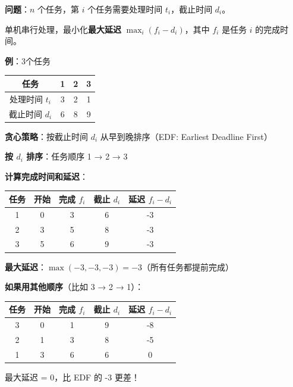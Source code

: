 \documentclass[12pt, a4paper]{ctexart}
\begin{document}
\begin{blackboard}[最小化最大延迟问题]

\textbf{问题}：$n$ 个任务，第 $i$ 个任务需要处理时间 $t_i$，截止时间 $d_i$。

单机串行处理，最小化\textbf{最大延迟} $\max_i (f_i - d_i)$，其中 $f_i$ 是任务 $i$ 的完成时间。

\textbf{例}：3个任务

\begin{center}
\begin{tabular}{c|ccc}
任务 & 1 & 2 & 3 \\
\hline
处理时间 $t_i$ & 3 & 2 & 1 \\
截止时间 $d_i$ & 6 & 8 & 9 \\
\end{tabular}
\end{center}

\textbf{贪心策略}：按截止时间 $d_i$ 从早到晚排序（EDF: Earliest Deadline First）

\end{blackboard}

\begin{blackboard}[最小化最大延迟手算]

\textbf{按 $d_i$ 排序}：任务顺序 1 → 2 → 3

\textbf{计算完成时间和延迟}：

\begin{center}
\begin{tabular}{c|cccc}
任务 & 开始 & 完成 $f_i$ & 截止 $d_i$ & 延迟 $f_i - d_i$ \\
\hline
1 & 0 & 3 & 6 & -3 \\
2 & 3 & 5 & 8 & -3 \\
3 & 5 & 6 & 9 & -3 \\
\end{tabular}
\end{center}

\textbf{最大延迟}：$\max(-3, -3, -3) = -3$（所有任务都提前完成）

\textbf{如果用其他顺序}（比如 3 → 2 → 1）：

\begin{center}
\begin{tabular}{c|cccc}
任务 & 开始 & 完成 $f_i$ & 截止 $d_i$ & 延迟 $f_i - d_i$ \\
\hline
3 & 0 & 1 & 9 & -8 \\
2 & 1 & 3 & 8 & -5 \\
1 & 3 & 6 & 6 & 0 \\
\end{tabular}
\end{center}

最大延迟 = 0，比 EDF 的 -3 更差！

\end{blackboard}
\end{document}
